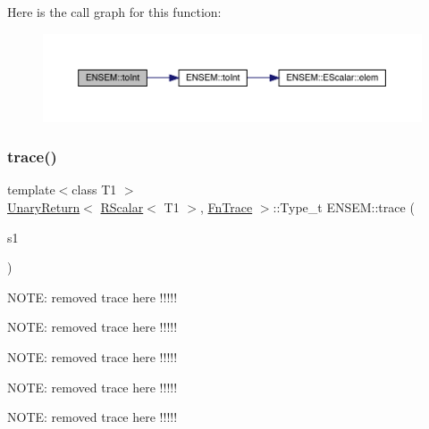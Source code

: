 Here is the call graph for this function\+:\nopagebreak
\begin{figure}[H]
\begin{center}
\leavevmode
\includegraphics[width=350pt]{d9/ded/group__rscalar_ga7507e0e1da7cf75743141d70fd7150c8_cgraph}
\end{center}
\end{figure}
\mbox{\label{group__rscalar_ga0d92a68fbffd9e97af74d7c35b92536b}} 
\subsubsection{\texorpdfstring{trace()}{trace()}}
{\footnotesize\ttfamily template$<$class T1 $>$ \\
\mbox{\hyperlink{structENSEM_1_1UnaryReturn}{Unary\+Return}}$<$ \mbox{\hyperlink{classENSEM_1_1RScalar}{R\+Scalar}}$<$ T1 $>$, \mbox{\hyperlink{structENSEM_1_1FnTrace}{Fn\+Trace}} $>$\+::Type\+\_\+t E\+N\+S\+E\+M\+::trace (\begin{DoxyParamCaption}\item[{const \mbox{\hyperlink{classENSEM_1_1RScalar}{R\+Scalar}}$<$ T1 $>$ \&}]{s1 }\end{DoxyParamCaption})\hspace{0.3cm}{\ttfamily [inline]}}

N\+O\+TE\+: removed trace here !!!!!

N\+O\+TE\+: removed trace here !!!!!

N\+O\+TE\+: removed trace here !!!!!

N\+O\+TE\+: removed trace here !!!!!

N\+O\+TE\+: removed trace here !!!!! \mbox{\label{group__rscalar_ga04705f685567963d28806500dd6dde85}} 
